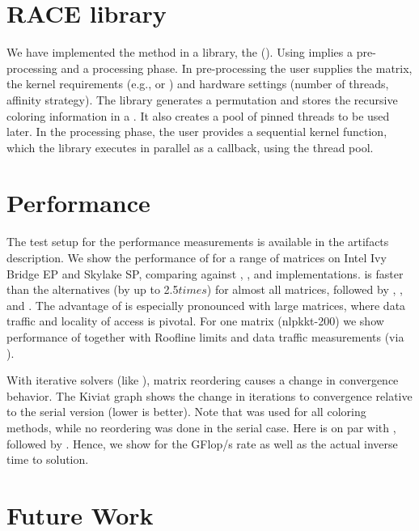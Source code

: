 \section{RACE library}

We have implemented the \RAC method in a library, the \RACEfull (\RACE).
Using \RACE implies a pre-processing and a processing phase.
In pre-processing the user supplies the matrix, the kernel requirements
(e.g., \DONE or \DTWO) and hardware settings (number of threads,
affinity strategy). The library generates a permutation and stores the
recursive coloring information in a \levelTree. It also creates
a pool of pinned threads to be used later. In the processing phase,
the user provides a sequential kernel function, which the library
executes in parallel as a callback, using the thread pool. 

\section{Performance}

The test setup for the performance measurements is available in the
artifacts description. We show the performance of \SymmSpmv %
for a range of matrices on Intel Ivy Bridge EP and Skylake SP,
comparing \RACE against \ABMC, \MC, and \MKL implementations. \RACE is
faster than the alternatives (by up to 2.5$times$) for almost all
matrices, followed by \ABMC, \MKL, and \MC. The advantage of \RACE is
especially pronounced with large matrices, where data traffic and
locality of access is pivotal. For one matrix (nlpkkt-200) we show
performance of \SymmSpmv together with Roof\/line limits and data
traffic measurements (via \LIKWID \cite{LIKWID}).


With iterative solvers (like \KACZ), matrix reordering causes a change
in convergence behavior. The Kiviat graph shows the change in
iterations to convergence relative to the serial version (lower is
better). Note that \RCM was used for all coloring methods, while no
reordering was done in the serial case. Here \RACE is on par with
\ABMC, followed by \MC. Hence, we show for \KACZ the GFlop/s rate as
well as the actual inverse time to solution.


\section{Future Work}

